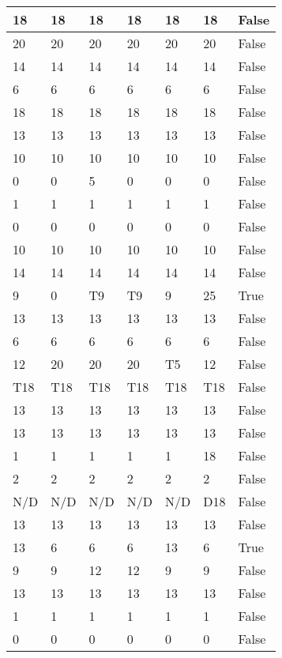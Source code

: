 \begin{longtable}[htbp]{| p{} | p{} | p{}| p{}| p{}| p{}| p{}|}
18 & 18 & 18 & 18 & 18 & 18 & False \\ \hline
20 & 20 & 20 & 20 & 20 & 20 & False \\ \hline
14 & 14 & 14 & 14 & 14 & 14 & False \\ \hline
6 & 6 & 6 & 6 & 6 & 6 & False \\ \hline
18 & 18 & 18 & 18 & 18 & 18 & False \\ \hline
13 & 13 & 13 & 13 & 13 & 13 & False \\ \hline
10 & 10 & 10 & 10 & 10 & 10 & False \\ \hline
0 & 0 & 5 & 0 & 0 & 0 & False \\ \hline
1 & 1 & 1 & 1 & 1 & 1 & False \\ \hline
0 & 0 & 0 & 0 & 0 & 0 & False \\ \hline
10 & 10 & 10 & 10 & 10 & 10 & False \\ \hline
14 & 14 & 14 & 14 & 14 & 14 & False \\ \hline
9 & 0 & \multicolumn{1}{l|}{T9} & \multicolumn{1}{l|}{T9} & 9 & 25 & True \\ \hline
13 & 13 & 13 & 13 & 13 & 13 & False \\ \hline
6 & 6 & 6 & 6 & 6 & 6 & False \\ \hline
12 & 20 & 20 & 20 & \multicolumn{1}{l|}{T5} & 12 & False \\ \hline
\multicolumn{1}{|l|}{T18} & \multicolumn{1}{l|}{T18} & \multicolumn{1}{l|}{T18} & \multicolumn{1}{l|}{T18} & \multicolumn{1}{l|}{T18} & \multicolumn{1}{l|}{T18} & False \\ \hline
13 & 13 & 13 & 13 & 13 & 13 & False \\ \hline
13 & 13 & 13 & 13 & 13 & 13 & False \\ \hline
1 & 1 & 1 & 1 & 1 & 18 & False \\ \hline
2 & 2 & 2 & 2 & 2 & 2 & False \\ \hline
\multicolumn{1}{|l|}{N/D} & \multicolumn{1}{l|}{N/D} & \multicolumn{1}{l|}{N/D} & \multicolumn{1}{l|}{N/D} & \multicolumn{1}{l|}{N/D} & \multicolumn{1}{l|}{D18} & False \\ \hline
13 & 13 & 13 & 13 & 13 & 13 & False \\ \hline
13 & 6 & 6 & 6 & 13 & 6 & True \\ \hline
9 & 9 & 12 & 12 & 9 & 9 & False \\ \hline
13 & 13 & 13 & 13 & 13 & 13 & False \\ \hline
1 & 1 & 1 & 1 & 1 & 1 & False \\ \hline
0 & 0 & 0 & 0 & 0 & 0 & False \\ \hline

\end{longtable}
